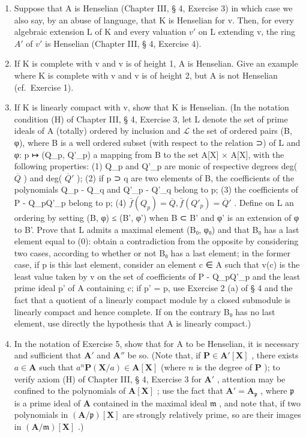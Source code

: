 \begin{enumerate}
\def\labelenumi{(\alph{enumi})}
\item
  Suppose that A is Henselian (Chapter III, § 4, Exercise 3) in which case we also say, by an abuse of language, that K is Henselian for v. Then, for every algebraic extension L of K and every valuation \(v'\) on L extending v, the ring \(A'\) of \(v'\) is Henselian (Chapter III, § 4, Exercise 4).
\item
  If K is complete with v and v is of height 1, A is Henselian. Give an example where K is complete with v and v is of height 2, but A is not Henselian (cf.~Exercise 1).
\item
  If K is linearly compact with v, show that K is Henselian. (In the notation condition (H) of Chapter III, § 4, Exercise 3, let L denote the set of prime ideals of A (totally) ordered by inclusion and \(\mathcal{L}\) the set of ordered pairs (B, φ), where B is a well ordered subset (with respect to the relation ⊃) of L and φ: p ↦ (Q\_p, Q'\_p) a mapping from B to the set A{[}X{]} × A{[}X{]}, with the following properties: (1) Q\_p and Q'\_p are monic of respective degrees deg( \(\overline{Q}\) ) and deg( \(\overline{Q}'\) ); (2) if p ⊃ q are two elements of B, the coefficients of the polynomials Q\_p - Q\_q and Q'\_p - Q'\_q belong to p; (3) the coefficients of P - Q\_pQ'\_p belong to p; (4) \(\bar{f}(Q_{p}) = \overline{Q}, \bar{f}(Q'_{p}) = \overline{Q}'\) . Define on L an ordering by setting (B, φ) ≤ (B', φ') when B ⊂ B' and φ' is an extension of φ to B'. Prove that L admits a maximal element (B₀, φ₀) and that B₀ has a last element equal to (0): obtain a contradiction from the opposite by considering two cases, according to whether or not B₀ has a last element; in the former case, if p is this last element, consider an element c ∈ A such that v(c) is the least value taken by v on the set of coefficients of P - Q\_pQ'\_p and the least prime ideal p' of A containing c; if p' = p, use Exercise 2 (a) of § 4 and the fact that a quotient of a linearly compact module by a closed submodule is linearly compact and hence complete. If on the contrary B₀ has no last element, use directly the hypothesis that A is linearly compact.)
\item
  In the notation of Exercise 5, show that for A to be Henselian, it is necessary and sufficient that \(\mathbf{A}'\) and \(\mathbf{A}''\) be so. (Note that, if \(\mathbf{P} \in \mathbf{A}'[\mathbf{X}]\) , there exists \(a \in \mathbf{A}\) such that \(a^n\mathbf{P}(\mathbf{X}/a) \in \mathbf{A}[\mathbf{X}]\) (where \(n\) is the degree of \(\mathbf{P}\) ); to verify axiom (H) of Chapter III, § 4, Exercise 3 for \(\mathbf{A}'\) , attention may be confined to the polynomials of \(\mathbf{A}[\mathbf{X}]\) ; use the fact that \(\mathbf{A}' = \mathbf{A}_{\mathfrak{p}}\) , where \(\mathfrak{p}\) is a prime ideal of \(\mathbf{A}\) contained in the maximal ideal \(\mathfrak{m}\) , and note that, if two polynomials in \((\mathbf{A}/\mathfrak{p})[\mathbf{X}]\) are strongly relatively prime, so are their images in \((\mathbf{A}/\mathfrak{m})[\mathbf{X}]\) .)

\end{enumerate}
